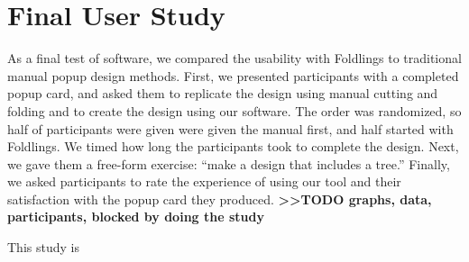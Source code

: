 \section{Final User Study}\label{final-user-study}

As a final test of software, we compared the usability with Foldlings to
traditional manual popup design methods. First, we presented
participants with a completed popup card, and asked them to replicate
the design using manual cutting and folding and to create the design
using our software. The order was randomized, so half of participants
were given were given the manual first, and half started with Foldlings.
We timed how long the participants took to complete the design. Next, we
gave them a free-form exercise: ``make a design that includes a tree.''
Finally, we asked participants to rate the experience of using our tool
and their satisfaction with the popup card they produced.
\textbf{\textgreater{}\textgreater{}TODO graphs, data, participants,
blocked by doing the study}

This study is
